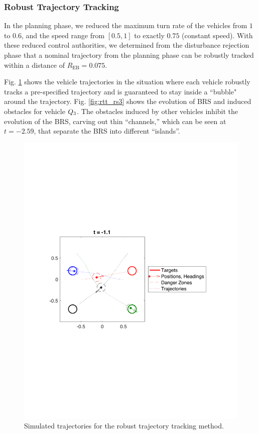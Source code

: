 \subsubsection{Robust Trajectory Tracking}
In the planning phase, we reduced the maximum turn rate of the vehicles from $1$ to $0.6$, and the speed range from $[0.5, 1]$ to exactly $0.75$ (constant speed). With these reduced control authorities, we determined from the disturbance rejection phase that a nominal trajectory from the planning phase can be robustly tracked within a distance of $R_{\text{EB}} = 0.075$.

Fig. \ref{fig:rtt_traj} shows the vehicle trajectories in the situation where each vehicle robustly tracks a pre-specified trajectory and is guaranteed to stay inside a ``bubble" around the trajectory. Fig. \ref{fig:rtt_rs3} shows the evolution of BRS and induced obstacles for vehicle $Q_3$. The obstacles induced by other vehicles inhibit the evolution of the BRS, carving out thin “channels,” which can be seen at $t = -2.59$, that separate the BRS into different “islands”. %

\begin{figure}
  \centering
  \includegraphics[width=\columnwidth]{"fig/rtt_traj"}
  \caption{Simulated trajectories for the robust trajectory tracking method.}
  \label{fig:rtt_traj}
\end{figure}

